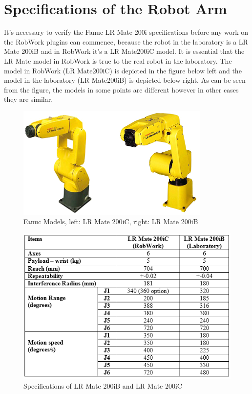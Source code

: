 \section{Specifications of the Robot Arm}
\label{sec:spec}

It's necessary to verify the Fanuc LR Mate 200i specifications before any work on the RobWork plugins can commence, because the robot in the laboratory is a LR Mate 200iB and in RobWork it's a LR Mate200iC model. It is essential that the LR Mate model in RobWork is true to the real robot in the laboratory. The model in RobWork (LR Mate200iC) is depicted in the figure below left and the model in the laboratory (LR Mate200iB) is depicted below right. As can be seen from the figure, the models in some points are different however in other cases they are similar.

\begin{figure}[H]
  \centering
  \includegraphics[scale= 0.8]{source/fanucModelPhoto.png}
  \caption{Fanuc Models, left: LR Mate 200iC, right: LR Mate 200iB}
  \label{fig:FanucModels}
\end{figure}

\begin{figure}[H]
  \centering
  \includegraphics[scale= 0.8]{source/table1.png}
  \caption{Specifications of LR Mate 200iB and LR Mate 200iC}
  \label{fig:tableSpecifications}
\end{figure}

